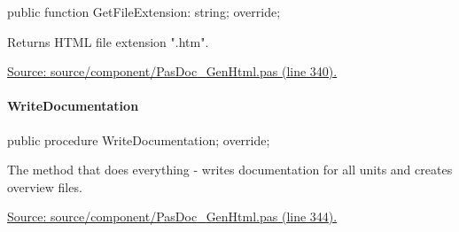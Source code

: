 \documentclass{report}
\newif\ifpdf
\begin{document}
\label{PasDoc_GenHtml.TGenericHTMLDocGenerator-GetFileExtension}
\begin{list}{}{
\setlength{\itemindent}{0cm}
\setlength{\listparindent}{0cm}
\setlength{\leftmargin}{\evensidemargin}
\addtolength{\leftmargin}{\tmplength}
\settowidth{\labelsep}{X}
\addtolength{\leftmargin}{\labelsep}
\setlength{\labelwidth}{\tmplength}
}
\item[\textbf{Declaration}\hfill]
\ifpdf
\begin{flushleft}
\fi
\begin{ttfamily}
public function GetFileExtension: string; override;\end{ttfamily}

\ifpdf
\end{flushleft}
\fi

\par
\item[\textbf{Description}]
Returns HTML file extension ".htm".\par
\href{https://github.com/pasdoc/pasdoc/blob/master/source/component/PasDoc_GenHtml.pas#L340}{Source: source/component/PasDoc{\_}GenHtml.pas (line 340).}

\end{list}
\paragraph*{WriteDocumentation}\hspace*{\fill}

\label{PasDoc_GenHtml.TGenericHTMLDocGenerator-WriteDocumentation}
\begin{list}{}{
\setlength{\itemindent}{0cm}
\setlength{\listparindent}{0cm}
\setlength{\leftmargin}{\evensidemargin}
\addtolength{\leftmargin}{\tmplength}
\settowidth{\labelsep}{X}
\addtolength{\leftmargin}{\labelsep}
\setlength{\labelwidth}{\tmplength}
}
\item[\textbf{Declaration}\hfill]
\ifpdf
\begin{flushleft}
\fi
\begin{ttfamily}
public procedure WriteDocumentation; override;\end{ttfamily}

\ifpdf
\end{flushleft}
\fi

\par
\item[\textbf{Description}]
The method that does everything {-} writes documentation for all units and creates overview files.\par
\href{https://github.com/pasdoc/pasdoc/blob/master/source/component/PasDoc_GenHtml.pas#L344}{Source: source/component/PasDoc{\_}GenHtml.pas (line 344).}

\end{list}
\ifpdf
\end{document}
